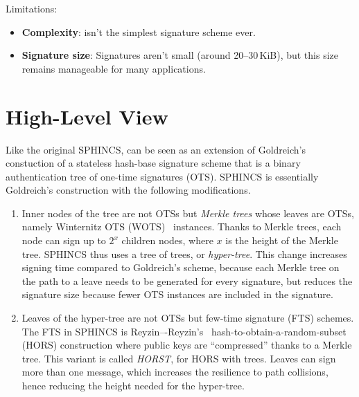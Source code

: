 Limitations:

\begin{itemize}

\item \textbf{Complexity}: \gravity isn't the simplest signature scheme ever.

\item \textbf{Signature size}: Signatures aren't small (around 20--30\,KiB), but this size remains manageable for many applications.

\end{itemize}

\section{High-Level View}

Like the original SPHINCS, \gravity can be seen as an extension of Goldreich's~\cite[\S6.4.2]{goldreich} constuction of a stateless hash-base signature scheme that is a binary authentication tree of one-time signatures (OTS).
SPHINCS is essentially Goldreich's construction with the following modifications.
\begin{enumerate}
    \item Inner nodes of the tree are not OTSs but \emph{Merkle trees} whose leaves are OTSs, namely Winternitz OTS (WOTS)~\cite{DBLP:conf/crypto/Merkle89,DBLP:conf/africacrypt/Hulsing13} instances. 
    Thanks to Merkle trees, each node can sign up to $2^x$ children nodes, where $x$ is the height of the Merkle tree.
    SPHINCS thus uses a tree of trees, or \emph{hyper-tree}. This change increases signing time compared to Goldreich's scheme, because each Merkle tree on the path to a leave needs to be generated for every signature, but reduces the signature size because fewer OTS instances are included in the signature.
    \item Leaves of the hyper-tree are not OTSs but few-time signature (FTS) schemes. The FTS in SPHINCS is Reyzin–-Reyzin's~\cite{hors} hash-to-obtain-a-random-subset (HORS) construction where public keys are ``compressed'' thanks to a Merkle tree. This variant is called \emph{HORST}, for HORS with trees. Leaves can sign more than one message, which increases the resilience to path collisions, hence reducing the height needed for the hyper-tree.
\end{enumerate}

